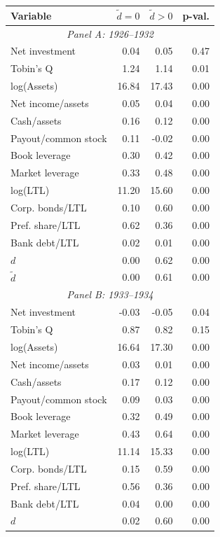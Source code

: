 \begin{threeparttable}
\begin{tabular}{lrrr}
\toprule
Variable & \ensuremath{\tilde{d}=0} & \ensuremath{\tilde{d}>0} & p-val. \\
\midrule
\multicolumn{4}{c}{\textit{Panel A: 1926--1932}} \\
\midrule
Net investment & 0.04 & 0.05 & 0.47 \\
Tobin's Q & 1.24 & 1.14 & 0.01 \\
log(Assets) & 16.84 & 17.43 & 0.00 \\
Net income/assets & 0.05 & 0.04 & 0.00 \\
Cash/assets & 0.16 & 0.12 & 0.00 \\
Payout/common stock & 0.11 & -0.02 & 0.00 \\
Book leverage & 0.30 & 0.42 & 0.00 \\
Market leverage & 0.33 & 0.48 & 0.00 \\
log(LTL) & 11.20 & 15.60 & 0.00 \\
Corp. bonds/LTL & 0.10 & 0.60 & 0.00 \\
Pref. share/LTL & 0.62 & 0.36 & 0.00 \\
Bank debt/LTL & 0.02 & 0.01 & 0.00 \\
\ensuremath{d} & 0.00 & 0.62 & 0.00 \\
\ensuremath{\tilde{d}} & 0.00 & 0.61 & 0.00 \\
\midrule
\multicolumn{4}{c}{\textit{Panel B: 1933--1934}} \\
\midrule
Net investment & -0.03 & -0.05 & 0.04 \\
Tobin's Q & 0.87 & 0.82 & 0.15 \\
log(Assets) & 16.64 & 17.30 & 0.00 \\
Net income/assets & 0.03 & 0.01 & 0.00 \\
Cash/assets & 0.17 & 0.12 & 0.00 \\
Payout/common stock & 0.09 & 0.03 & 0.00 \\
Book leverage & 0.32 & 0.49 & 0.00 \\
Market leverage & 0.43 & 0.64 & 0.00 \\
log(LTL) & 11.14 & 15.33 & 0.00 \\
Corp. bonds/LTL & 0.15 & 0.59 & 0.00 \\
Pref. share/LTL & 0.56 & 0.36 & 0.00 \\
Bank debt/LTL & 0.04 & 0.00 & 0.00 \\
\ensuremath{d} & 0.02 & 0.60 & 0.00 \\

\end{tabular}
\end{threeparttable}
